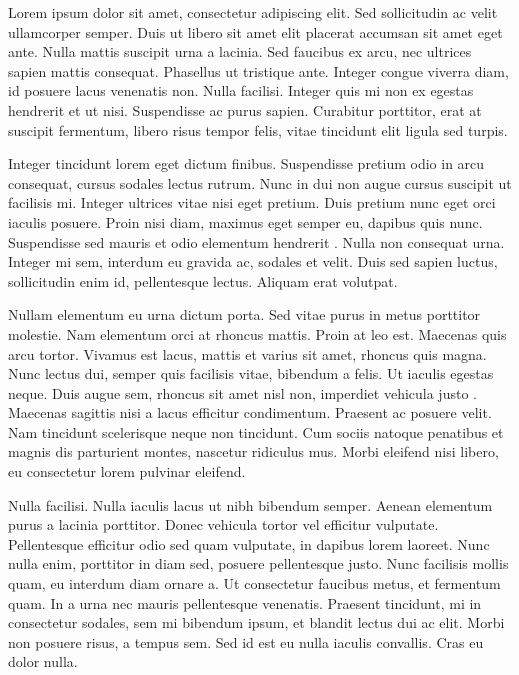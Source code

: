 Lorem ipsum dolor sit amet, consectetur adipiscing elit. Sed sollicitudin ac velit ullamcorper semper. Duis ut libero sit amet elit placerat accumsan sit amet eget ante. Nulla mattis suscipit urna a lacinia. Sed faucibus ex arcu, nec ultrices sapien mattis consequat. Phasellus ut tristique ante. Integer congue viverra diam, id posuere lacus venenatis non. Nulla facilisi. Integer quis mi non ex egestas hendrerit et ut nisi. Suspendisse ac purus sapien. Curabitur porttitor, erat at suscipit fermentum, libero risus tempor felis, vitae tincidunt elit ligula sed turpis.

Integer tincidunt lorem eget dictum finibus. Suspendisse pretium odio in arcu consequat, cursus sodales lectus rutrum. Nunc in dui non augue cursus suscipit ut facilisis mi. Integer ultrices vitae nisi eget pretium. Duis pretium nunc eget orci iaculis posuere. Proin nisi diam, maximus eget semper eu, dapibus quis nunc. Suspendisse sed mauris et odio elementum hendrerit \cite{ref1}. Nulla non consequat urna. Integer mi sem, interdum eu gravida ac, sodales et velit. Duis sed sapien luctus, sollicitudin enim id, pellentesque lectus. Aliquam erat volutpat.

Nullam elementum eu urna dictum porta. Sed vitae purus in metus porttitor molestie. Nam elementum orci at rhoncus mattis. Proin at leo est. Maecenas quis arcu tortor. Vivamus est lacus, mattis et varius sit amet, rhoncus quis magna. Nunc lectus dui, semper quis facilisis vitae, bibendum a felis. Ut iaculis egestas neque. Duis augue sem, rhoncus sit amet nisl non, imperdiet vehicula justo \cite{ref2}. Maecenas sagittis nisi a lacus efficitur condimentum. Praesent ac posuere velit. Nam tincidunt scelerisque neque non tincidunt. Cum sociis natoque penatibus et magnis dis parturient montes, nascetur ridiculus mus. Morbi eleifend nisi libero, eu consectetur lorem pulvinar eleifend.

Nulla facilisi. Nulla iaculis lacus ut nibh bibendum semper. Aenean elementum purus a lacinia porttitor. Donec vehicula tortor vel efficitur vulputate. Pellentesque \cite{ref3} efficitur odio sed quam vulputate, in dapibus lorem laoreet. Nunc nulla enim, porttitor in diam sed, posuere pellentesque justo. Nunc facilisis mollis quam, eu interdum diam ornare a. Ut consectetur faucibus metus, et fermentum quam. In a urna nec mauris pellentesque venenatis. Praesent tincidunt, mi in consectetur sodales, sem mi bibendum ipsum, et blandit lectus dui ac elit. Morbi non posuere risus, a tempus sem. Sed id est eu nulla iaculis convallis. Cras eu dolor nulla.


